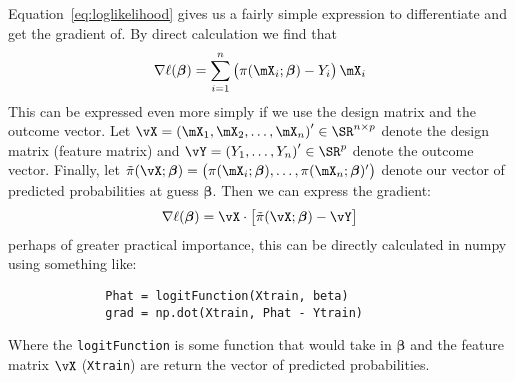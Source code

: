 \documentclass[10pt]{article}
\begin{document}
Equation~\eqref{eq:loglikelihood} gives us a fairly simple expression to differentiate and get the gradient of. By direct calculation we find that 
\begin{equation}
	\label{eq:ellGrad}
	\nabla \ell(\boldsymbol{\beta}) = \sum_{i=1}^n \left(\pi(\mX_i; \boldsymbol{\beta}) - Y_i\right)\mX_i
\end{equation}
This can be expressed even more simply if we use the design matrix and the outcome vector. Let \(\vX = \left(\mX_1, \mX_2, \dots, \mX_n\right)' \in \SR^{n \times p}\) denote the design matrix (feature matrix) and \(\vY = \left(Y_1, \dots, Y_n\right)' \in \SR^p\) denote the outcome vector. Finally, let \(\tilde{\pi}(\vX;\boldsymbol{\beta}) = \left(\pi(\mX_i;\boldsymbol{\beta}),\dots, \pi(\mX_n;\boldsymbol{\beta})'\right)\) denote our vector of predicted probabilities at guess \(\boldsymbol{\beta}\). Then we can express the gradient: 
\begin{equation}
	\label{eq:matGrad}
	\nabla \ell(\boldsymbol{\beta}) = \vX\cdot\left[\tilde\pi(\vX;\boldsymbol{\beta}) - \vY\right]
\end{equation}
perhaps of greater practical importance, this can be directly calculated in numpy using something like:
\begin{figure}[h!]
	\centering
	\begin{BVerbatim}
		Phat = logitFunction(Xtrain, beta)
		grad = np.dot(Xtrain, Phat - Ytrain)
	\end{BVerbatim}
\end{figure}

Where the \verb|logitFunction| is some function that would take in \(\boldsymbol{\beta}\) and the feature matrix \(\vX\) (\verb|Xtrain|) are return the vector of predicted probabilities.
\end{document}
